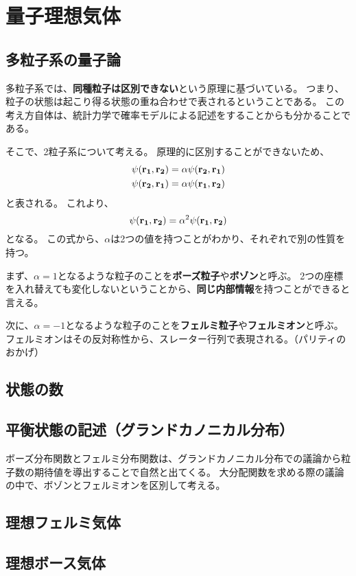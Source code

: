 \documentclass[a4paper]{jsreport}
\begin{document}
    \chapter{量子理想気体}
        \section{多粒子系の量子論}
            多粒子系では、\textbf{同種粒子は区別できない}という原理に基づいている。
            つまり、粒子の状態は起こり得る状態の重ね合わせで表されるということである。
            この考え方自体は、統計力学で確率モデルによる記述をすることからも分かることである。\par
            そこで、2粒子系について考える。
            原理的に区別することができないため、
            \begin{align}
                \psi(\vb{r_1}, \vb{r_2}) &= \alpha \psi(\vb{r_2}, \vb{r_1}) \\
                \psi(\vb{r_2}, \vb{r_1}) &= \alpha \psi(\vb{r_1}, \vb{r_2})
            \end{align}
            と表される。
            これより、
            \begin{equation}
                \psi(\vb{r_1}, \vb{r_2}) = \alpha^2 \psi(\vb{r_1}, \vb{r_2})
            \end{equation}
            となる。
            この式から、$\alpha$は2つの値を持つことがわかり、それぞれで別の性質を持つ。\par
            まず、$\alpha=1$となるような粒子のことを\textbf{ボーズ粒子}や\textbf{ボゾン}と呼ぶ。
            2つの座標を入れ替えても変化しないということから、\textbf{同じ内部情報}を持つことができると言える。\par
            次に、$\alpha=-1$となるような粒子のことを\textbf{フェルミ粒子}や\textbf{フェルミオン}と呼ぶ。
            フェルミオンはその反対称性から、スレーター行列で表現される。（パリティのおかげ）
        \section{状態の数}


        \section{平衡状態の記述（グランドカノニカル分布）}
            ボーズ分布関数とフェルミ分布関数は、グランドカノニカル分布での議論から粒子数の期待値を導出することで自然と出てくる。
            大分配関数を求める際の議論の中で、ボゾンとフェルミオンを区別して考える。


        \section{理想フェルミ気体}
        \section{理想ボース気体}
        
\end{document}
